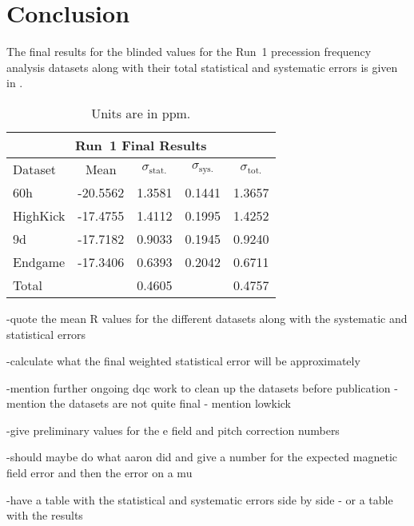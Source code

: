 
\thispagestyle{myheadings} %

\chapter{Conclusion}
\label{chapter:Conclusion}


The final results for the blinded \R values for the Run~1 precession frequency analysis datasets along with their total statistical and systematic errors is given in .


\begin{table}[]
\centering
\renewcommand{\arraystretch}{1.2}
\begin{tabular*}{\linewidth}{@{\extracolsep{\fill}}lcccc}
  \hline
    \multicolumn{5}{c}{\textbf{Run~1 Final Results}} \\
  \hline\hline
    Dataset & \multicolumn{1}{c}{Mean \R} & \multicolumn{1}{c}{$\sigma_{\text{stat.}}$} & \multicolumn{1}{c}{$\sigma_{\text{sys.}}$} & \multicolumn{1}{c}{$\sigma_{\text{tot.}}$} \\ 
  \hline
  	60h & -20.5562 & 1.3581 & 0.1441 & 1.3657 \\
  	HighKick & -17.4755 & 1.4112 & 0.1995 & 1.4252 \\
  	9d & -17.7182 & 0.9033 & 0.1945 & 0.9240 \\
  	Endgame & -17.3406 & 0.6393 & 0.2042 & 0.6711 \\
  \hline
  Total & & 0.4605 & & 0.4757 \\
  \hline
\end{tabular*}
\caption[]{Units are in ppm.}
\label{tab:FinalResults}
\end{table}







-quote the mean R values for the different datasets along with the systematic and statistical errors

-calculate what the final weighted statistical error will be approximately

-mention further ongoing dqc work to clean up the datasets before publication
-mention the datasets are not quite final - mention lowkick

-give preliminary values for the e field and pitch correction numbers


-should maybe do what aaron did and give a number for the expected magnetic field error and then the error on a mu

-have a table with the statistical and systematic errors side by side - or a table with the results



